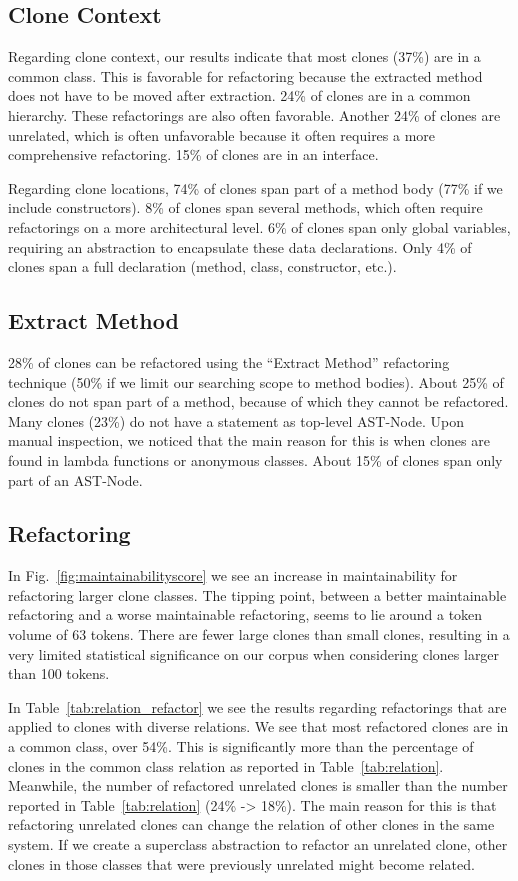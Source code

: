 \documentclass[]{IEEEtran}
\begin{document}
\subsection{Clone Context}
Regarding clone context, our results indicate that most clones (37\%) are in a common class. This is favorable for refactoring because the extracted method does not have to be moved after extraction. 24\% of clones are in a common hierarchy. These refactorings are also often favorable. Another 24\% of clones are unrelated, which is often unfavorable because it often requires a more comprehensive refactoring. 15\% of clones are in an interface.

Regarding clone locations, 74\% of clones span part of a method body (77\% if we include constructors). 8\% of clones span several methods, which often require refactorings on a more architectural level. 6\% of clones span only global variables, requiring an abstraction to encapsulate these data declarations. Only 4\% of clones span a full declaration (method, class, constructor, etc.).

\subsection{Extract Method}
28\% of clones can be refactored using the ``Extract Method'' refactoring technique (50\% if we limit our searching scope to method bodies). About 25\% of clones do not span part of a method, because of which they cannot be refactored. Many clones (23\%) do not have a statement as top-level AST-Node. Upon manual inspection, we noticed that the main reason for this is when clones are found in lambda functions or anonymous classes. About 15\% of clones span only part of an AST-Node.

\subsection{Refactoring}
In Fig.~\ref{fig:maintainabilityscore} we see an increase in maintainability for refactoring larger clone classes. The tipping point, between a better maintainable refactoring and a worse maintainable refactoring, seems to lie around a token volume of 63 tokens. There are fewer large clones than small clones, resulting in a very limited statistical significance on our corpus when considering clones larger than 100 tokens.

In Table~\ref{tab:relation_refactor} we see the results regarding refactorings that are applied to clones with diverse relations. We see that most refactored clones are in a common class, over 54\%. This is significantly more than the percentage of clones in the common class relation as reported in Table~\ref{tab:relation}. Meanwhile, the number of refactored unrelated clones is smaller than the number reported in Table~\ref{tab:relation} (24\% -> 18\%). The main reason for this is that refactoring unrelated clones can change the relation of other clones in the same system. If we create a superclass abstraction to refactor an unrelated clone, other clones in those classes that were previously unrelated might become related.
\end{document}
